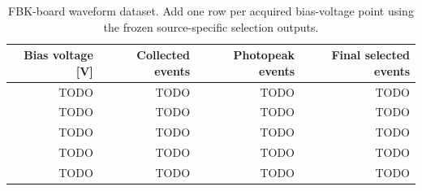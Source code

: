 \begin{table}[H]
    \centering
    \caption{FBK-board waveform dataset. Add one row per acquired bias-voltage point using the frozen source-specific selection outputs.}
    \label{tab:fbk-board-dataset}
    \begin{tabular}{rrrr}
        \toprule
        Bias voltage [V] & Collected events & Photopeak events & Final selected events \\
        \midrule
        TODO & TODO & TODO & TODO \\
        TODO & TODO & TODO & TODO \\
        TODO & TODO & TODO & TODO \\
        TODO & TODO & TODO & TODO \\
        TODO & TODO & TODO & TODO \\
        \bottomrule
    \end{tabular}
\end{table}
